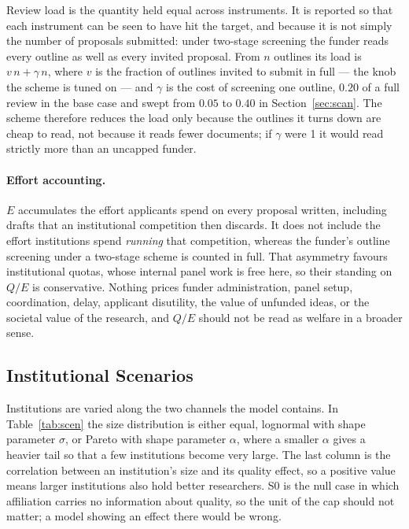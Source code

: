 \documentclass[11pt,a4paper]{article}
\begin{document}
Review load is the quantity held equal across instruments. It is reported so that
each instrument can be seen to have hit the target, and because it is not simply
the number of proposals submitted: under two-stage screening the funder reads
every outline as well as every invited proposal. From $n$ outlines its load is
$v\,n + \gamma\,n$, where $v$ is the fraction of outlines invited to submit in
full --- the knob the scheme is tuned on --- and $\gamma$ is the cost of screening
one outline, $0.20$ of a full review in the base case and swept from $0.05$ to
$0.40$ in Section~\ref{sec:scan}. The scheme therefore reduces the load only
because the outlines it turns down are cheap to read, not because it reads fewer
documents; if $\gamma$ were 1 it would read strictly more than an uncapped funder.

\paragraph{Effort accounting.}\label{sec:effort} $E$ accumulates the effort applicants spend on
every proposal written, including drafts that an institutional competition then
discards. It does not include the effort institutions spend \emph{running} that
competition, whereas the funder's outline screening under a two-stage scheme is
counted in full. That asymmetry favours institutional quotas, whose internal panel
work is free here, so their standing on $Q/E$ is conservative. Nothing prices
funder administration, panel setup, coordination, delay, applicant disutility, the
value of unfunded ideas, or the societal value of the research, and $Q/E$ should
not be read as welfare in a broader sense.

\subsection{Institutional Scenarios}

Institutions are varied along the two channels the model contains. In
Table~\ref{tab:scen} the size distribution is either equal, lognormal with shape
parameter $\sigma$, or Pareto with shape parameter $\alpha$, where a smaller
$\alpha$ gives a heavier tail so that a few institutions become very large. The
last column is the correlation between an institution's size and its quality
effect, so a positive value means larger institutions also hold better
researchers. S0 is the null case in which affiliation carries no information about
quality, so the unit of the cap should not matter; a model showing an effect there
would be wrong.
\end{document}
